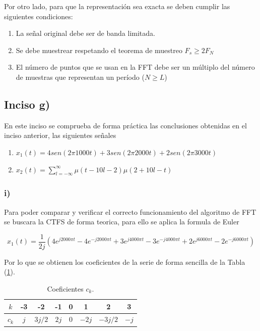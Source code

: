 \documentclass{article}
\begin{document}
    Por otro lado, para que la representación sea exacta se deben cumplir las siguientes condiciones:
    \begin{enumerate}
        \item La señal original debe ser de banda limitada.
        \item Se debe muestrear respetando el teorema de muestreo $F_s\geq 2F_N$
        \item El número de puntos que se usan en la FFT debe ser un múltiplo del número de muestras que representan un período ($N\geq L$)
    \end{enumerate}

    \subsection*{Inciso g)}

    En este inciso se comprueba de forma práctica las conclusiones obtenidas en 
    el inciso anterior, las siguientes señales 
    
    \begin{enumerate}
        \item $x_1(t)= 4 sen( 2\pi 1000 t ) + 3sen( 2\pi 2000 t ) + 2sen( 2\pi 3000 t )$
        \item $ x_2(t)= \sum_{l=-\infty}^{\infty} \mu( t - 10l - 2  )\mu( 2 + 10l - t )$
    \end{enumerate}

    \subsubsection*{i)}

    Para poder comparar y verificar el correcto funcionamiento del algoritmo de FFT
    se buscara la CTFS de forma teorica, para ello se aplica la formula de Euler
    
    \begin{equation}
        x_1(t) = \frac{1}{2j} ( 4e^{j2000 \pi t} - 4e^{-j2000 \pi t}  +3e^{j4000 \pi t} - 3e^{-j4000 \pi t} +2e^{j6000 \pi t} - 2e^{-j6000 \pi t} )
    \end{equation}

    

    Por lo que se obtienen los coeficientes de la serie de forma sencilla de la Tabla (\ref{tab.2gi}).

    \begin{table}[H]
        \centering
        \begin{tabular}{|c|c|c|c|c|c|c|c|}
            \hline
            $k$ & -3 & -2 & -1 & 0 & 1 & 2 & 3  \\ \hline
            $c_k$ & $j$ & $3j/2$ & $2j$ & 0 & $-2j$ & $-3j/2$ & $-j$ \\ \hline
            \end{tabular}
        \caption{Coeficientes $c_k$.}
        \label{tab.2gi}
    \end{table}
\end{document}
